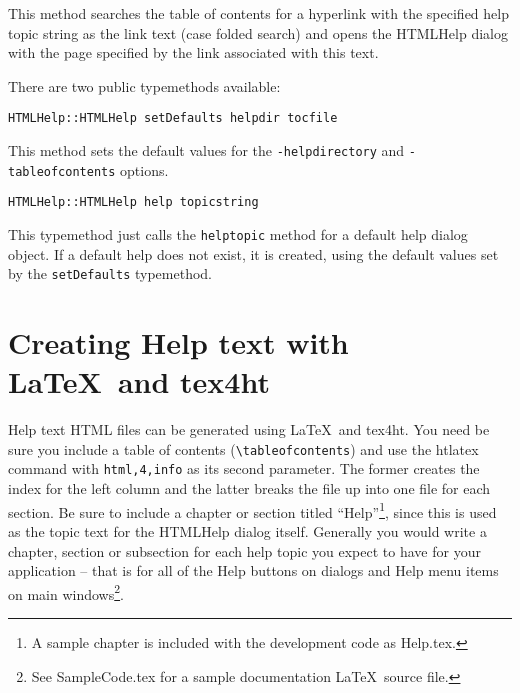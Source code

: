 This method searches the table of contents for a hyperlink with the
specified help topic string as the link text (case folded search) and
opens the HTMLHelp dialog with the page specified by the link
associated with this text.

There are two public typemethods available:

\begin{verbatim}
HTMLHelp::HTMLHelp setDefaults helpdir tocfile
\end{verbatim}

This method sets the default values for the \verb=-helpdirectory= and
\verb=-tableofcontents= options.

\begin{verbatim}
HTMLHelp::HTMLHelp help topicstring
\end{verbatim}

This typemethod just calls the \verb=helptopic= method for a default help
dialog object.  If a default help does not exist, it is created, using
the default values set by the \verb=setDefaults= typemethod.

\section{Creating Help text with \LaTeX\  and tex4ht}

Help text HTML files can be generated using \LaTeX\  and tex4ht.  You
need be sure you include a table of contents (\verb=\tableofcontents=)
and use the htlatex command with \verb=html,4,info= as its second
parameter. The former creates the index for the left column and the
latter breaks the file up into one file for each section.  Be sure to
include a chapter or section titled ``Help''\footnote{A sample chapter
is included with the development code as Help.tex.}, since this is used
as the topic text for the HTMLHelp dialog itself.  Generally you would
write a chapter, section or subsection for each help topic you expect
to have for your application -- that is for all of the Help buttons on
dialogs and Help menu items on main windows\footnote{See SampleCode.tex
for a sample documentation \LaTeX\  source file.}.




